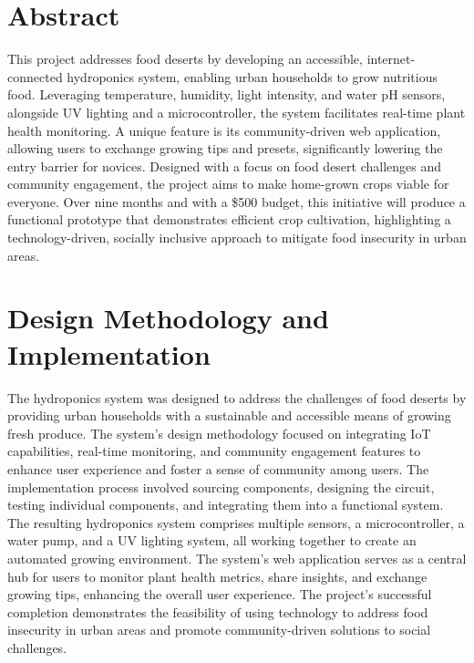 \documentclass[12pt]{article}
\newcommand{\comment}[1]{} %
\begin{document}
\comment {


\section*{Acknowledgment}
\addcontentsline{toc}{section}{Acknowledgment}
\lipsum[1] %

}

\tableofcontents
\pagebreak

\listoftables
\pagebreak

\listoffigures
\pagebreak

\section*{Abstract}
\noindent This project addresses food deserts by developing an accessible, internet-connected hydroponics system, enabling urban households to grow nutritious food. Leveraging temperature, humidity, light intensity, and water pH sensors, alongside UV lighting and a microcontroller, the system facilitates real-time plant health monitoring. A unique feature is its community-driven web application, allowing users to exchange growing tips and presets, significantly lowering the entry barrier for novices. Designed with a focus on food desert challenges and community engagement, the project aims to make home-grown crops viable for everyone. Over nine months and with a \$500 budget, this initiative will produce a functional prototype that demonstrates efficient crop cultivation, highlighting a technology-driven, socially inclusive approach to mitigate food insecurity in urban areas.


\section{Design Methodology and Implementation}
\noindent The hydroponics system was designed to address the challenges of food deserts by providing urban households with a sustainable and accessible means of growing fresh produce. The system's design methodology focused on integrating IoT capabilities, real-time monitoring, and community engagement features to enhance user experience and foster a sense of community among users. The implementation process involved sourcing components, designing the circuit, testing individual components, and integrating them into a functional system. The resulting hydroponics system comprises multiple sensors, a microcontroller, a water pump, and a UV lighting system, all working together to create an automated growing environment. The system's web application serves as a central hub for users to monitor plant health metrics, share insights, and exchange growing tips, enhancing the overall user experience. The project's successful completion demonstrates the feasibility of using technology to address food insecurity in urban areas and promote community-driven solutions to social challenges.
\end{document}
